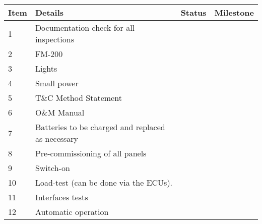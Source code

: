\begin{table}[h]

\RaggedRight
\centering
\begin{tabular}{lp{4.5cm}ll}
\toprule
Item &Details &Status &Milestone\\
\midrule
1     &Documentation check for all inspections & &\\
2     &FM-200 & &\\
3     &Lights & &\\
4     &Small power & &\\
5     &T\&C Method Statement & &\\
6     &O\&M Manual & &\\
7     &Batteries to be charged and replaced as necessary & &\\
8     &Pre-commissioning of all panels & &\\
9     &Switch-on& &\\
10    &Load-test (can be done via the ECUs).& &\\
11    &Interfaces tests                     & &\\
12    & Automatic operation                 & &\\
\bottomrule
\end{tabular}
\end{table}





















